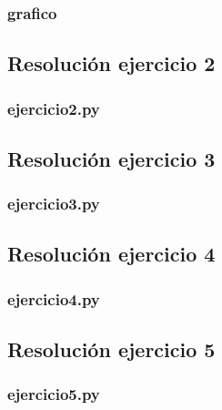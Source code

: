 \documentclass[11pt,a4paper]{article}
\begin{document}
		\subsubsection{grafico}
			

	\newpage

	\subsection{Resolución ejercicio 2}\label{ejercicio_2}
		\subsubsection{ejercicio2.py}

	\newpage

	\subsection{Resolución ejercicio 3}\label{ejercicio_3}
		\subsubsection{ejercicio3.py}
			

	\newpage

	\subsection{Resolución ejercicio 4}\label{ejercicio_4}
		\subsubsection{ejercicio4.py}
			

	\newpage

	\subsection{Resolución ejercicio 5}\label{ejercicio_5}
		\subsubsection{ejercicio5.py}
			
\end{document}
